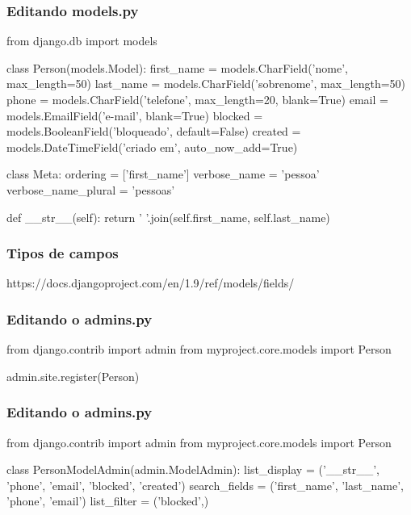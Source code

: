 \documentclass[aspectratio=169]{beamer}
\begin{document}
{\begin{frame}[fragile]\frametitle{Editando models.py}

\begin{pythoncode}
from django.db import models

class Person(models.Model):
    first_name = models.CharField('nome', max_length=50)
    last_name = models.CharField('sobrenome', max_length=50)
    phone = models.CharField('telefone', max_length=20, blank=True)
    email = models.EmailField('e-mail', blank=True)
    blocked = models.BooleanField('bloqueado', default=False)
    created = models.DateTimeField('criado em', auto_now_add=True)

    class Meta:
        ordering = ['first_name']
        verbose_name = 'pessoa'
        verbose_name_plural = 'pessoas'

    def __str__(self):
        return ' '.join(self.first_name, self.last_name)
\end{pythoncode}

\end{frame}

\begin{frame}\frametitle{Tipos de campos}
  \begin{center}
    \Large https://docs.djangoproject.com/en/1.9/ref/models/fields/
  \end{center}
\end{frame}

\begin{frame}[fragile]\frametitle{Editando o admins.py}

\begin{pythoncode}
from django.contrib import admin
from myproject.core.models import Person

admin.site.register(Person)
\end{pythoncode}

\end{frame}

\begin{frame}[fragile]\frametitle{Editando o admins.py}

\begin{pythoncode}
from django.contrib import admin
from myproject.core.models import Person

class PersonModelAdmin(admin.ModelAdmin):
    list_display = ('__str__', 'phone', 'email',
                    'blocked', 'created')
    search_fields = ('first_name', 'last_name', 'phone', 'email')
    list_filter = ('blocked',)


\end{pythoncode}
\end{frame}}
\end{document}
